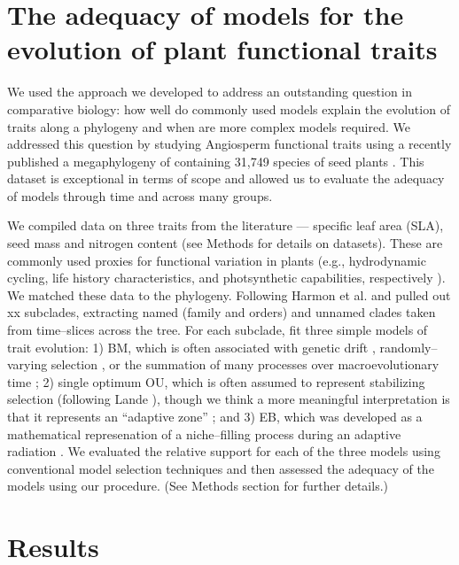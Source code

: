 \documentclass[a4paper,12pt]{article}
\begin{document}
\section{The adequacy of models for the evolution of plant functional traits}

We used the approach we developed to address an outstanding question in comparative biology: how well do commonly used models explain the evolution of traits along a phylogeny and when are more complex models required. We addressed this question by studying Angiosperm functional traits using a recently published a megaphylogeny of containing 31,749 species of seed plants \citep{Zanne2013}. This dataset is exceptional in terms of scope and allowed us to evaluate the adequacy of models through time and across many groups.  

We compiled data on three traits from the literature --- specific leaf area (SLA), seed mass and nitrogen content (see Methods for details on datasets). These are commonly used proxies for functional variation in plants (e.g., hydrodynamic cycling, life history characteristics, and photsynthetic capabilities, respectively \citep{Westoby2002}). We  matched these data to the phylogeny. Following Harmon et al. \citep{Harmon2010} and pulled out xx subclades, extracting named (family and orders) and unnamed clades taken from time--slices across the tree. For each subclade, fit three simple models of trait evolution: 1) BM, which is often associated with genetic drift \citep{Lande1976, Felsenstein1988, Lynch1990, HansenMartins1996}, randomly--varying selection \citep{Felsenstein1973}, or the summation of many processes over macroevolutionary time \citep{HansenMartins1996, Uyeda2011, PennellPE}; 2) single optimum OU, which is often assumed to represent stabilizing selection (following Lande \citep{Lande1976}), though we think a more meaningful interpretation is that it represents an ``adaptive zone'' \citep{Arnold2001, Hansen2012book, PennellHarmon}; and 3) EB, which was developed as a mathematical represenation of a niche--filling process during an adaptive radiation \citep{Harmon2010, SlaterPennell}. We evaluated the relative support for each of the three models using conventional model selection techniques and then assessed the adequacy of the models using our procedure. (See Methods section for further details.) 

\section{Results}
\end{document}
